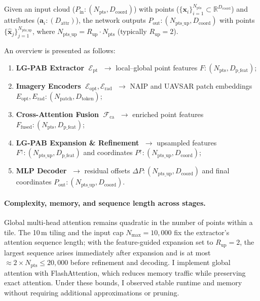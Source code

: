\documentclass[12pt]{report}
\begin{document}
Given an input cloud ($P_{\text{in}}: (N_{\text{pts}}, D_{\text{coord}})$) with points
 ($\{\mathbf{{x}}_i\}_{i=1}^{N_{\text{pts}}}\subset\mathbb{R}^{D_{\text{coord}}}$) and attributes ($\mathbf{a}_i: (D_{\text{attr}})$), the network outputs $P_{\text{out}}: (N_{\text{pts\_up}}, D_{\text{coord}})$ with points $\{\hat{\mathbf{x}}_j\}_{j=1}^{N_{\text{pts\_up}}}$, where $N_{\text{pts\_up}} = R_{\text{up}} \cdot N_{\text{pts}}$ (typically $R_{\text{up}} = 2$).

An overview is presented as follows:

\begin{enumerate}[leftmargin=*]
\item \textbf{LG-PAB Extractor
} $\;\mathcal{E}_{\mathrm{pt}}$
      $\;\rightarrow$ local–global point features $F: (N_{\text{pts}}, D_{\text{p\_feat}})$;
\item \textbf{Imagery Encoders} $\;\mathcal{E}_{\mathrm{opt}},\mathcal{E}_{\mathrm{rad}}$
      $\;\rightarrow$ NAIP and UAVSAR patch embeddings $E_{\text{opt}}, E_{\text{rad}}: (N_{\text{patch}}, D_{\text{token}})$;
\item \textbf{Cross-Attention Fusion} $\;\mathcal{F}_{\mathrm{ca}}$
      $\;\rightarrow$ enriched point features $F_{\!\mathrm{fused}}: (N_{\text{pts}}, D_{\text{p\_feat}})$;
\item \textbf{LG-PAB Expansion \& Refinement}
      $\;\rightarrow$ upsampled features $F^{\uparrow}: (N_{\text{pts\_up}}, D_{\text{p\_feat}})$ and coordinates $P^{\uparrow}: (N_{\text{pts\_up}}, D_{\text{coord}})$;
\item \textbf{MLP Decoder} $\;\rightarrow$ residual offsets $\Delta P: (N_{\text{pts\_up}}, D_{\text{coord}})$ and final coordinates $P_{\mathrm{out}}: (N_{\text{pts\_up}}, D_{\text{coord}})$.
\end{enumerate}


\paragraph{Complexity, memory, and sequence length across stages.}
Global multi-head attention remains quadratic in the number of points within a tile. The 10\,m tiling and the input cap $N_{\max}=10{,}000$ fix the extractor’s attention sequence length; with the feature-guided expansion set to $R_{\text{up}}=2$, the largest sequence arises immediately after expansion and is at most $\approx 2\times N_{\text{pts}} \le 20{,}000$ before refinement and decoding. I implement global attention with FlashAttention, which reduces memory traffic while preserving exact attention. Under these bounds, I observed stable runtime and memory without requiring additional approximations or pruning.
\end{document}
